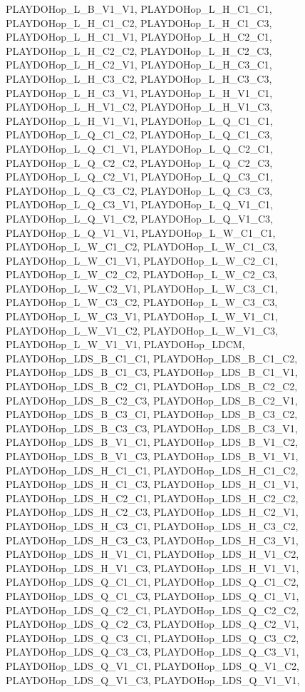 PLAYDOHop\_\-L\_\-B\_\-V1\_\-V1, PLAYDOHop\_\-L\_\-H\_\-C1\_\-C1, PLAYDOHop\_\-L\_\-H\_\-C1\_\-C2, PLAYDOHop\_\-L\_\-H\_\-C1\_\-C3, PLAYDOHop\_\-L\_\-H\_\-C1\_\-V1, PLAYDOHop\_\-L\_\-H\_\-C2\_\-C1, PLAYDOHop\_\-L\_\-H\_\-C2\_\-C2, PLAYDOHop\_\-L\_\-H\_\-C2\_\-C3, PLAYDOHop\_\-L\_\-H\_\-C2\_\-V1, PLAYDOHop\_\-L\_\-H\_\-C3\_\-C1, PLAYDOHop\_\-L\_\-H\_\-C3\_\-C2, PLAYDOHop\_\-L\_\-H\_\-C3\_\-C3, PLAYDOHop\_\-L\_\-H\_\-C3\_\-V1, PLAYDOHop\_\-L\_\-H\_\-V1\_\-C1, PLAYDOHop\_\-L\_\-H\_\-V1\_\-C2, PLAYDOHop\_\-L\_\-H\_\-V1\_\-C3, PLAYDOHop\_\-L\_\-H\_\-V1\_\-V1, PLAYDOHop\_\-L\_\-Q\_\-C1\_\-C1, PLAYDOHop\_\-L\_\-Q\_\-C1\_\-C2, PLAYDOHop\_\-L\_\-Q\_\-C1\_\-C3, PLAYDOHop\_\-L\_\-Q\_\-C1\_\-V1, PLAYDOHop\_\-L\_\-Q\_\-C2\_\-C1, PLAYDOHop\_\-L\_\-Q\_\-C2\_\-C2, PLAYDOHop\_\-L\_\-Q\_\-C2\_\-C3, PLAYDOHop\_\-L\_\-Q\_\-C2\_\-V1, PLAYDOHop\_\-L\_\-Q\_\-C3\_\-C1, PLAYDOHop\_\-L\_\-Q\_\-C3\_\-C2, PLAYDOHop\_\-L\_\-Q\_\-C3\_\-C3, PLAYDOHop\_\-L\_\-Q\_\-C3\_\-V1, PLAYDOHop\_\-L\_\-Q\_\-V1\_\-C1, PLAYDOHop\_\-L\_\-Q\_\-V1\_\-C2, PLAYDOHop\_\-L\_\-Q\_\-V1\_\-C3, PLAYDOHop\_\-L\_\-Q\_\-V1\_\-V1, PLAYDOHop\_\-L\_\-W\_\-C1\_\-C1, PLAYDOHop\_\-L\_\-W\_\-C1\_\-C2, PLAYDOHop\_\-L\_\-W\_\-C1\_\-C3, PLAYDOHop\_\-L\_\-W\_\-C1\_\-V1, PLAYDOHop\_\-L\_\-W\_\-C2\_\-C1, PLAYDOHop\_\-L\_\-W\_\-C2\_\-C2, PLAYDOHop\_\-L\_\-W\_\-C2\_\-C3, PLAYDOHop\_\-L\_\-W\_\-C2\_\-V1, PLAYDOHop\_\-L\_\-W\_\-C3\_\-C1, PLAYDOHop\_\-L\_\-W\_\-C3\_\-C2, PLAYDOHop\_\-L\_\-W\_\-C3\_\-C3, PLAYDOHop\_\-L\_\-W\_\-C3\_\-V1, PLAYDOHop\_\-L\_\-W\_\-V1\_\-C1, PLAYDOHop\_\-L\_\-W\_\-V1\_\-C2, PLAYDOHop\_\-L\_\-W\_\-V1\_\-C3, PLAYDOHop\_\-L\_\-W\_\-V1\_\-V1, PLAYDOHop\_\-LDCM, PLAYDOHop\_\-LDS\_\-B\_\-C1\_\-C1, PLAYDOHop\_\-LDS\_\-B\_\-C1\_\-C2, PLAYDOHop\_\-LDS\_\-B\_\-C1\_\-C3, PLAYDOHop\_\-LDS\_\-B\_\-C1\_\-V1, PLAYDOHop\_\-LDS\_\-B\_\-C2\_\-C1, PLAYDOHop\_\-LDS\_\-B\_\-C2\_\-C2, PLAYDOHop\_\-LDS\_\-B\_\-C2\_\-C3, PLAYDOHop\_\-LDS\_\-B\_\-C2\_\-V1, PLAYDOHop\_\-LDS\_\-B\_\-C3\_\-C1, PLAYDOHop\_\-LDS\_\-B\_\-C3\_\-C2, PLAYDOHop\_\-LDS\_\-B\_\-C3\_\-C3, PLAYDOHop\_\-LDS\_\-B\_\-C3\_\-V1, PLAYDOHop\_\-LDS\_\-B\_\-V1\_\-C1, PLAYDOHop\_\-LDS\_\-B\_\-V1\_\-C2, PLAYDOHop\_\-LDS\_\-B\_\-V1\_\-C3, PLAYDOHop\_\-LDS\_\-B\_\-V1\_\-V1, PLAYDOHop\_\-LDS\_\-H\_\-C1\_\-C1, PLAYDOHop\_\-LDS\_\-H\_\-C1\_\-C2, PLAYDOHop\_\-LDS\_\-H\_\-C1\_\-C3, PLAYDOHop\_\-LDS\_\-H\_\-C1\_\-V1, PLAYDOHop\_\-LDS\_\-H\_\-C2\_\-C1, PLAYDOHop\_\-LDS\_\-H\_\-C2\_\-C2, PLAYDOHop\_\-LDS\_\-H\_\-C2\_\-C3, PLAYDOHop\_\-LDS\_\-H\_\-C2\_\-V1, PLAYDOHop\_\-LDS\_\-H\_\-C3\_\-C1, PLAYDOHop\_\-LDS\_\-H\_\-C3\_\-C2, PLAYDOHop\_\-LDS\_\-H\_\-C3\_\-C3, PLAYDOHop\_\-LDS\_\-H\_\-C3\_\-V1, PLAYDOHop\_\-LDS\_\-H\_\-V1\_\-C1, PLAYDOHop\_\-LDS\_\-H\_\-V1\_\-C2, PLAYDOHop\_\-LDS\_\-H\_\-V1\_\-C3, PLAYDOHop\_\-LDS\_\-H\_\-V1\_\-V1, PLAYDOHop\_\-LDS\_\-Q\_\-C1\_\-C1, PLAYDOHop\_\-LDS\_\-Q\_\-C1\_\-C2, PLAYDOHop\_\-LDS\_\-Q\_\-C1\_\-C3, PLAYDOHop\_\-LDS\_\-Q\_\-C1\_\-V1, PLAYDOHop\_\-LDS\_\-Q\_\-C2\_\-C1, PLAYDOHop\_\-LDS\_\-Q\_\-C2\_\-C2, PLAYDOHop\_\-LDS\_\-Q\_\-C2\_\-C3, PLAYDOHop\_\-LDS\_\-Q\_\-C2\_\-V1, PLAYDOHop\_\-LDS\_\-Q\_\-C3\_\-C1, PLAYDOHop\_\-LDS\_\-Q\_\-C3\_\-C2, PLAYDOHop\_\-LDS\_\-Q\_\-C3\_\-C3, PLAYDOHop\_\-LDS\_\-Q\_\-C3\_\-V1, PLAYDOHop\_\-LDS\_\-Q\_\-V1\_\-C1, PLAYDOHop\_\-LDS\_\-Q\_\-V1\_\-C2, PLAYDOHop\_\-LDS\_\-Q\_\-V1\_\-C3, PLAYDOHop\_\-LDS\_\-Q\_\-V1\_\-V1, 